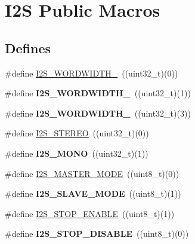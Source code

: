 \hypertarget{group___i2_s___public___macros}{\section{\-I2\-S \-Public \-Macros}
\label{group___i2_s___public___macros}
}
\subsection*{\-Defines}
\begin{DoxyCompactItemize}
\item 
\#define \hyperlink{group___i2_s___public___macros_ga17cb1a91d5be4e7afad486ead6d2980d}{\-I2\-S\-\_\-\-W\-O\-R\-D\-W\-I\-D\-T\-H\-\_}~((uint32\-\_\-t)(0))
\item 
\hypertarget{group___i2_s___public___macros_ga4d016baad0fba07da20a6410470c71d3}{\#define {\bfseries \-I2\-S\-\_\-\-W\-O\-R\-D\-W\-I\-D\-T\-H\-\_}~((uint32\-\_\-t)(1))}\label{group___i2_s___public___macros_ga4d016baad0fba07da20a6410470c71d3}

\item 
\hypertarget{group___i2_s___public___macros_ga683d81436e91c1631bdd5947ee78489b}{\#define {\bfseries \-I2\-S\-\_\-\-W\-O\-R\-D\-W\-I\-D\-T\-H\-\_}~((uint32\-\_\-t)(3))}\label{group___i2_s___public___macros_ga683d81436e91c1631bdd5947ee78489b}

\item 
\#define \hyperlink{group___i2_s___public___macros_ga07e34ebc83183644aa54cc124b769a43}{\-I2\-S\-\_\-\-S\-T\-E\-R\-E\-O}~((uint32\-\_\-t)(0))
\item 
\hypertarget{group___i2_s___public___macros_ga3c732d1467300d87c582a1497e8dbadf}{\#define {\bfseries \-I2\-S\-\_\-\-M\-O\-N\-O}~((uint32\-\_\-t)(1))}\label{group___i2_s___public___macros_ga3c732d1467300d87c582a1497e8dbadf}

\item 
\#define \hyperlink{group___i2_s___public___macros_ga67cd00ecbec35d0dd723909916fb1014}{\-I2\-S\-\_\-\-M\-A\-S\-T\-E\-R\-\_\-\-M\-O\-D\-E}~((uint8\-\_\-t)(0))
\item 
\hypertarget{group___i2_s___public___macros_ga37137132251bc15250edcea1585d3e58}{\#define {\bfseries \-I2\-S\-\_\-\-S\-L\-A\-V\-E\-\_\-\-M\-O\-D\-E}~((uint8\-\_\-t)(1))}\label{group___i2_s___public___macros_ga37137132251bc15250edcea1585d3e58}

\item 
\#define \hyperlink{group___i2_s___public___macros_gabe1e11f6f4ce8542408e466b3316ca3c}{\-I2\-S\-\_\-\-S\-T\-O\-P\-\_\-\-E\-N\-A\-B\-L\-E}~((uint8\-\_\-t)(1))
\item 
\hypertarget{group___i2_s___public___macros_gaf442a366f6467626a2f72fdabf9b6d89}{\#define {\bfseries \-I2\-S\-\_\-\-S\-T\-O\-P\-\_\-\-D\-I\-S\-A\-B\-L\-E}~((uint8\-\_\-t)(0))}\label{group___i2_s___public___macros_gaf442a366f6467626a2f72fdabf9b6d89}


\end{DoxyCompactItemize}
